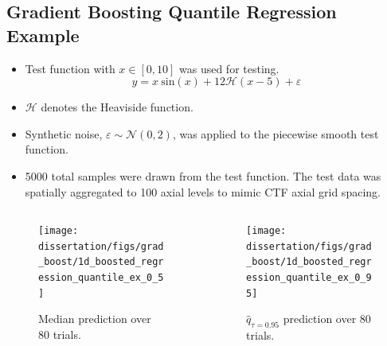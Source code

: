\documentclass[t, pdftex]{beamer}
\begin{document}
\subsection*{Gradient Boosting Quantile Regression Example}
\begin{frame}
\vspace{-16pt}
\scriptsize{
\begin{itemize}
    \item Test function with $x\in [0,10]$ was used for testing.
    \[
    y = x\ \mathrm{sin}(x) +12 \mathcal H(x-5)+\varepsilon
    \]
    \item $\mathcal H$ denotes the Heaviside function. 
    \item Synthetic noise, $\varepsilon \sim \mathcal N(0,2)$, was applied to the piecewise smooth test function.   
    \item 5000 total samples were drawn from the test function.  The test data was spatially aggregated to 100 axial levels to mimic CTF axial grid spacing.
\end{itemize}   
}
\vspace{-28pt}
\begin{columns}
    \begin{column}{0.5\textwidth}
        \begin{figure}
            \centering
            \texttt{[image: dissertation/figs/grad\_boost/1d\_boosted\_regression\_quantile\_ex\_0\_5]}
            \caption{\centering \scriptsize Median prediction over 80 trials.}
        \end{figure}
    \end{column}
    \begin{column}{0.5\textwidth}  %
        \begin{figure}
            \centering
            \texttt{[image: dissertation/figs/grad\_boost/1d\_boosted\_regression\_quantile\_ex\_0\_95]}
            \caption{\centering \scriptsize $\hat{q}_{\tau=0.95}$ prediction over 80 trials.}
        \end{figure}
    \end{column}
\end{columns}
\end{frame}
\end{document}

